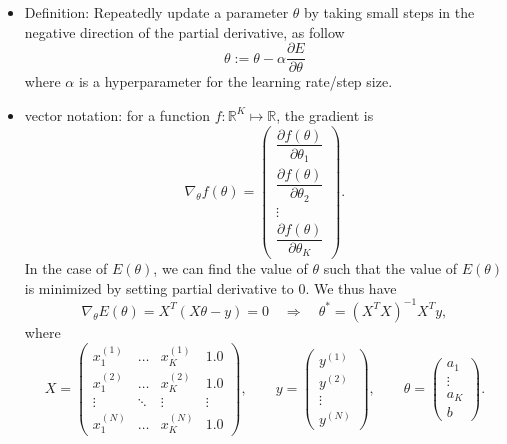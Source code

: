 \documentclass[twocolumn,landscape,10pt]{article}
\theoremstyle{definition}
\begin{document}
\begin{itemize}
    \item Definition: Repeatedly update a parameter $\theta$ by taking small
        steps in the negative direction of the partial derivative, as follow
        \[
            \theta := \theta - \alpha \frac{\partial E}{\partial \theta}
        \]
        where $\alpha$ is a hyperparameter for the learning rate/step size.
    \item vector notation: for a function $f:\mathbb{R}^{K}\mapsto\mathbb{R}$,
        the gradient is
        \[
            \nabla_\theta f(\theta) = \begin{pmatrix}
                \dfrac{\partial f(\theta)}{\partial \theta_1} \\[2ex]
                \dfrac{\partial f(\theta)}{\partial \theta_2} \\
                \vdots \\
                \dfrac{\partial f(\theta)}{\partial \theta_K}
            \end{pmatrix}.
        \]
        In the case of $E(\theta)$, we can find the value of $\theta$ such that
        the value of $E(\theta)$ is minimized by setting partial derivative to 0.
        We thus have
        \[
            \nabla_\theta E(\theta) = X^T(X\theta - y)=0
            \quad\Longrightarrow\quad \theta^* = {\left(X^TX\right)}^{-1}X^Ty,
        \]
        where
        \[
            X = \begin{pmatrix}
                x_1^{(1)} & \ldots & x_{K}^{(1)} & 1.0 \\[1ex]
                x_1^{(2)} & \ldots & x_{K}^{(2)} & 1.0 \\
                \vdots & \ddots & \vdots & \vdots \\
                x_1^{(N)} & \ldots & x_{K}^{(N)} & 1.0
            \end{pmatrix},\qquad
            y = \begin{pmatrix}
                y^{(1)} \\
                y^{(2)} \\
                \vdots \\
                y^{(N)}
            \end{pmatrix},\qquad
            \theta = \begin{pmatrix}
                    a_1 \\
                    \vdots \\
                    a_K \\
                    b
            \end{pmatrix}.
        \]
\end{itemize} 
\end{document}
